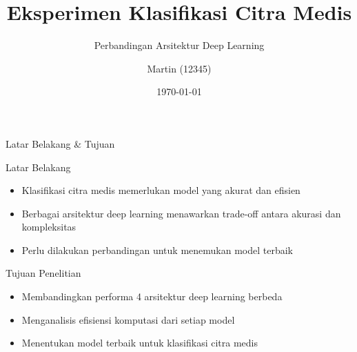 \documentclass[aspectratio=169]{beamer}
\title{Eksperimen Klasifikasi Citra Medis}
\subtitle{Perbandingan Arsitektur Deep Learning}
\author{Martin (12345)}
\institute{Program Studi Biomedis\\Institut Teknologi Sumatera (ITERA)}
\date{\today}
\begin{document}
\begin{frame}
\titlepage
\end{frame}

\begin{frame}{Latar Belakang \& Tujuan}
\begin{block}{Latar Belakang}
\begin{itemize}
    \item Klasifikasi citra medis memerlukan model yang akurat dan efisien
    \item Berbagai arsitektur deep learning menawarkan trade-off antara akurasi dan kompleksitas
    \item Perlu dilakukan perbandingan untuk menemukan model terbaik
\end{itemize}
\end{block}

\vspace{0.5cm}

\begin{block}{Tujuan Penelitian}
\begin{itemize}
    \item Membandingkan performa 4 arsitektur deep learning berbeda
    \item Menganalisis efisiensi komputasi dari setiap model
    \item Menentukan model terbaik untuk klasifikasi citra medis
\end{itemize}
\end{block}
\end{frame}
\end{document}
